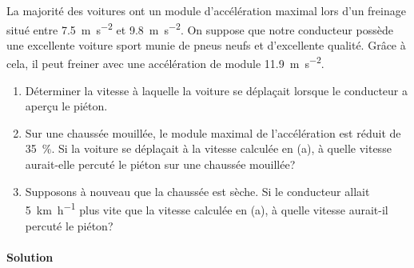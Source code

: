 La majorité des voitures ont un module d'accélération maximal lors
d'un freinage situé entre \SI{7.5}{\meter\per\second\squared} et
\SI{9.8}{\meter\per\second\squared}.  On suppose que notre conducteur possède
une excellente voiture sport munie de pneus neufs et d'excellente qualité.
Grâce à cela, il peut freiner avec une accélération de module
\SI{11.9}{\meter\per\second\squared}.


\begin{enumerate}[a]
  \item Déterminer la vitesse à laquelle la voiture se déplaçait
    lorsque le conducteur a aperçu le piéton.
  \item Sur une chaussée mouillée, le module maximal de l'accélération est
    réduit de \SI{35}{\percent}.  Si la voiture se déplaçait à la vitesse
    calculée en (a), à quelle vitesse aurait-elle percuté le piéton sur une
    chaussée mouillée?
  \item Supposons à nouveau que la chaussée est sèche.  Si le conducteur allait
    \SI{5}{\kilo\meter\per\hour} plus vite que la vitesse calculée en (a), à
    quelle vitesse aurait-il percuté le piéton?
\end{enumerate}

\paragraph{Solution}


